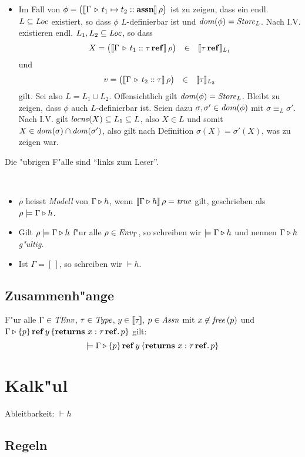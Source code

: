\documentclass[12pt,a4paper,bigheadings]{scrartcl}
\newcommand{\semantic}[1]{\ensuremath{\llbracket#1\rrbracket}}
\newcommand{\assn}{\ensuremath{\mathbf{assn}}}
\newcommand{\TEnv}{\name{TEnv}}
\newcommand{\Assn}{\name{Assn}}
\newcommand{\locns}{\name{locns}}
\begin{document}
\begin{beweis}
\begin{itemize}
    \item Im Fall von $\phi = \bigl(\semantic{\Tj{\Gamma}{t_1\mapsto t_2}{\assn}}\,\rho\bigr)$ ist zu zeigen,
          dass ein endl. $L\subseteq{\text{\it Loc\/}}$ existiert, so dass $\phi$ $L$-definierbar ist und ${\text{\it dom\/}}(\phi)={\text{\it Store\/}}_L$.
          Nach I.V. existieren endl. $L_1,L_2\subseteq{\text{\it Loc\/}}$, so dass
          \[\begin{array}{rcl}
            X = \bigl(\semantic{\Tj{\Gamma}{t_1}{\reftype{\tau}}}\,\rho\bigr) &\in& \semantic{\reftype{\tau}}_{L_1}
          \end{array}\]
          und
          \[\begin{array}{rcl}
            v = \bigl(\semantic{\Tj{\Gamma}{t_2}{\tau}}\,\rho\bigr) &\in& \semantic{\tau}_{L_2}
          \end{array}\]
          gilt. Sei also $L = L_1 \cup L_2$. Offensichtlich gilt ${\text{\it dom\/}}(\phi) = {\text{\it Store\/}}_L$. Bleibt zu zeigen, dass
          $\phi$ auch $L$-definierbar ist. Seien dazu $\sigma,\sigma'\in{\text{\it dom\/}}(\phi)$ mit $\sigma \equiv_L \sigma'$.
          Nach I.V. gilt $\locns(X) \subseteq L_1 \subseteq L$, also $X \in L$ und somit
          $X\in{\text{\it dom\/}}(\sigma)\cap{\text{\it dom\/}}(\sigma')$, also gilt nach Definition $\sigma(X) = \sigma'(X)$, was zu zeigen war.
  \end{itemize}
  Die "ubrigen F"alle sind "`links zum Leser"'.
\end{beweis}

\begin{definition}[Modell] \
  \begin{itemize}
    \item $\rho$ heisst {\em Modell} von $\Gamma \triangleright h$, wenn $\semantic{\Tjh{\Gamma}{h}}\,\rho = \true$
          gilt, geschrieben als $\rho \models \Gamma \triangleright h$.
    \item Gilt $\rho \models \Gamma \triangleright h$ f"ur alle $\rho\in{\text{\it Env\/}}_\Gamma$, so schreiben wir
          $\models \Gamma \triangleright h$ und nennen  $\Gamma \triangleright h$ {\em g"ultig}.
    \item Ist $\Gamma = [\,]$, so schreiben wir $\models h$.
  \end{itemize}
\end{definition}


\subsection{Zusammenh"ange}

\begin{lemma}
  F"ur alle $\Gamma\in\TEnv$, $\tau\in{\text{\it Type\/}}$, $y\in\semantic{\tau}$, $p \in\Assn$ mit
  $x \not \in {\text{\it free\/}}\,(p)$ und $\Gamma \triangleright \{p\}\,\mathbf{ref}\,y\,\{{\bf returns}\ x:\tau\,\mathbf{ref}.\, p\}$ gilt:
  \[
    \models \Gamma \triangleright \{p\}\,\mathbf{ref}\,y\,\{{\bf returns}\ x:\tau\,\mathbf{ref}.\, p\}
  \]
\end{lemma}



\section{Kalk"ul}

Ableitbarkeit: $\vdash h$

\subsection{Regeln}
\end{document}

